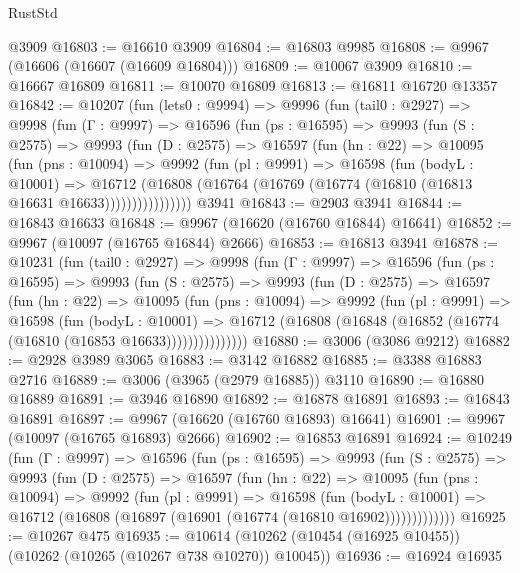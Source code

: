 \begin{lexlean}{RustStd}
\begin{coremodule}
{\begin{coremodule}
{{{{{{{{{{{{{{{{{{{{{{{{{{{{{{{{{{{{{{{{{{{{{{{{{{{{{{{{{{{{{{{{{{{{{{{{{{{{{{    @3909
@16803 := @16610 @3909
@16804 := @16803 @9985
@16808 := @9967 (@16606 (@16607 (@16609 @16804)))
@16809 := @10067 @3909
@16810 := @16667 @16809
@16811 := @10070 @16809
@16813 := @16811 @16720 @13357
@16842 := @10207
    (fun (lets0 : @9994) =>
    @9996
      (fun (tail0 : @2927) =>
      @9998
        (fun (Γ : @9997) =>
        @16596
          (fun (ps : @16595) =>
          @9993
            (fun (S : @2575) =>
            @9993
              (fun (D : @2575) =>
              @16597
                (fun (hn : @22) =>
                @10095
                  (fun (pns : @10094) =>
                  @9992
                    (fun (pl : @9991) =>
                    @16598
                      (fun (bodyL : @10001) =>
                      @16712
                        (@16808
                          (@16764 (@16769 (@16774 (@16810 (@16813 @16631 @16633))))))))))))))))
    @3941
@16843 := @2903 @3941
@16844 := @16843 @16633
@16848 := @9967 (@16620 (@16760 @16844) @16641)
@16852 := @9967 (@10097 (@16765 @16844) @2666)
@16853 := @16813 @3941
@16878 := @10231
    (fun (tail0 : @2927) =>
    @9998
      (fun (Γ : @9997) =>
      @16596
        (fun (ps : @16595) =>
        @9993
          (fun (S : @2575) =>
          @9993
            (fun (D : @2575) =>
            @16597
              (fun (hn : @22) =>
              @10095
                (fun (pns : @10094) =>
                @9992
                  (fun (pl : @9991) =>
                  @16598
                    (fun (bodyL : @10001) =>
                    @16712 (@16808 (@16848 (@16852 (@16774 (@16810 (@16853 @16633)))))))))))))))
@16880 := @3006 (@3086 @9212)
@16882 := @2928 @3989 @3065
@16883 := @3142 @16882
@16885 := @3388 @16883 @2716
@16889 := @3006 (@3965 (@2979 @16885)) @3110
@16890 := @16880 @16889
@16891 := @3946 @16890
@16892 := @16878 @16891
@16893 := @16843 @16891
@16897 := @9967 (@16620 (@16760 @16893) @16641)
@16901 := @9967 (@10097 (@16765 @16893) @2666)
@16902 := @16853 @16891
@16924 := @10249
    (fun (Γ : @9997) =>
    @16596
      (fun (ps : @16595) =>
      @9993
        (fun (S : @2575) =>
        @9993
          (fun (D : @2575) =>
          @16597
            (fun (hn : @22) =>
            @10095
              (fun (pns : @10094) =>
              @9992
                (fun (pl : @9991) =>
                @16598
                  (fun (bodyL : @10001) =>
                  @16712 (@16808 (@16897 (@16901 (@16774 (@16810 @16902)))))))))))))
@16925 := @10267 @475
@16935 := @10614 (@10262 (@10454 (@16925 @10455)) (@10262 (@10265 (@10267 @738 @10270)) @10045))
@16936 := @16924 @16935
}}}}}}}}}}}}}}}}}}}}}}}}}}}}}}}}}}}}}}}}}}}}}}}}}}}}}}}}}}}}}}}}}}}}}}}}}}}}}}
\end{coremodule}}
\end{coremodule}
\end{lexlean}

